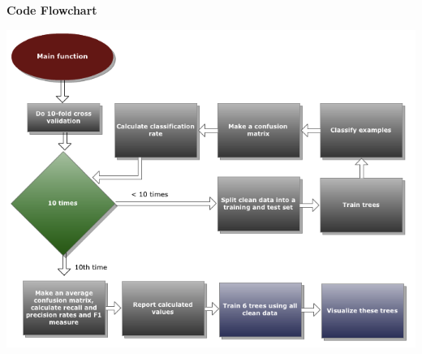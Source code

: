 \documentclass[12pt]{article}
\begin{document}
\newpage

{\bf Code Flowchart} \\
\begin{center}
  \includegraphics[scale=0.6]{report-images/flowchart.png}
\end{center}
\end{document}
